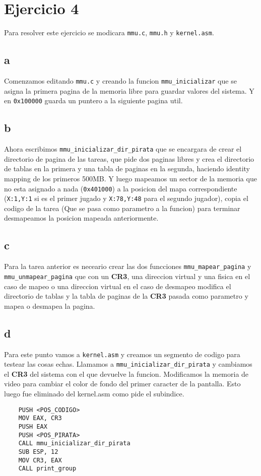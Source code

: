 \section{Ejercicio 4}

Para resolver este ejercicio se modicara \texttt{mmu.c}, \texttt{mmu.h} y \texttt{kernel.asm}.

\subsection{a}
Comenzamos editando \texttt{mmu.c} y creando la funcion \texttt{mmu\_inicializar} que se asigna la primera pagina de la memoria libre para guardar valores del sistema. Y en \texttt{0x100000} guarda un puntero a la siguiente pagina util.

\subsection{b}
Ahora escribimos \texttt{mmu\_inicializar\_dir\_pirata} que se encargara de crear el directorio de pagina de las tareas, que pide dos paginas libres y crea el directorio de tablas en la primera y una tabla de paginas en la segunda, haciendo identity mapping de los primeros 500MB. Y luego mapeamos un sector de la memoria que no esta asignado a nada (\texttt{0x401000}) a la posicion del mapa correspondiente (\texttt{X:1,Y:1} si es el primer jugado y \texttt{X:78,Y:48} para el segundo jugador), copia el codigo de la tarea (Que se pasa como parametro a la funcion) para terminar desmapeamos la posicion mapeada anteriormente.

\subsection{c}
Para la tarea anterior es neceario crear las dos funcciones \texttt{mmu\_mapear\_pagina} y \texttt{mmu\_unmapear\_pagina} que con un \textbf{CR3}, una direccion virtual y una fisica en el caso de mapeo o una direccion virtual en el caso de desmapeo modifica el directorio de tablas y la tabla de paginas de la \textbf{CR3} pasada como parametro y mapea o desmapea la pagina.

\subsection{d}
Para este punto vamos a \texttt{kernel.asm} y creamos un segmento de codigo para testear las cosas echas. Llamamos a \texttt{mmu\_inicializar\_dir\_pirata} y cambiamos el \textbf{CR3} del sistema con el que devuelve la funcion. Modificamos la memoria de video para cambiar el color de fondo del primer caracter de la pantalla. Esto luego fue eliminado del kernel.asm como pide el subindice.
\begin{lstlisting}
	PUSH <POS_CODIGO>
    MOV EAX, CR3
    PUSH EAX
    PUSH <POS_PIRATA>
    CALL mmu_inicializar_dir_pirata
    SUB ESP, 12
    MOV CR3, EAX
    CALL print_group
\end{lstlisting}